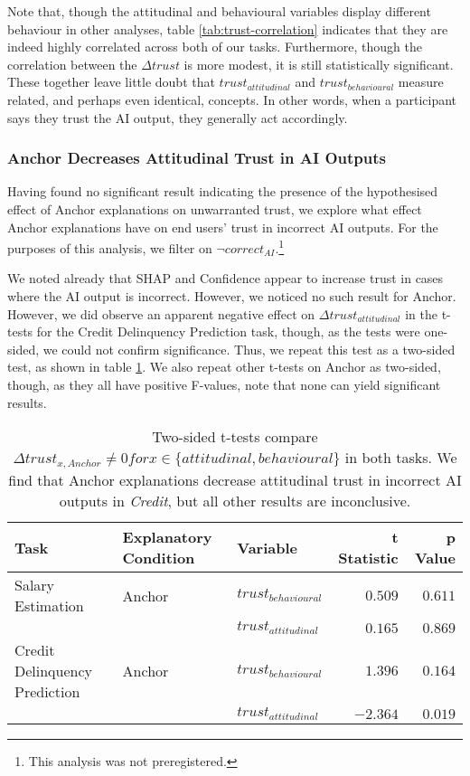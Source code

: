 Note that, though the attitudinal and behavioural variables display different behaviour in other analyses, table \ref{tab:trust-correlation} indicates that they are indeed highly correlated across both of our tasks. Furthermore, though the correlation between the $\Delta trust$ is more modest, it is still statistically significant. These together leave little doubt that $trust_{attitudinal}$ and $trust_{behavioural}$ measure related, and perhaps even identical, concepts. In other words, when a participant says they trust the AI output, they generally act accordingly.

\subsubsection{Anchor Decreases Attitudinal Trust in AI Outputs}\label{sec:anchor-attitudinal}
Having found no significant result indicating the presence of the hypothesised effect of Anchor explanations on unwarranted trust, we explore what effect Anchor explanations have on end users' trust in incorrect AI outputs. For the purposes of this analysis, we filter on $\neg correct_{AI}$.\footnote{This analysis was not preregistered.}

We noted already that SHAP and Confidence appear to increase trust in cases where the AI output is incorrect. However, we noticed no such result for Anchor. However, we did observe an apparent negative effect on $\Delta trust_{attitudinal}$ in the t-tests for the Credit Delinquency Prediction task, though, as the tests were one-sided, we could not confirm significance. Thus, we repeat this test as a two-sided test, as shown in table \ref{tab:delta-trust-t-2}. We also repeat other t-tests on Anchor as two-sided, though, as they all have positive F-values, note that none can yield significant results.

\begin{table}[htb]
    \caption{Two-sided t-tests compare $\Delta trust_{x,Anchor} \neq 0 for x \in \{attitudinal, behavioural\}$ in both tasks. We find that Anchor explanations decrease attitudinal trust in incorrect AI outputs in \emph{Credit}, but all other results are inconclusive.}
    \label{tab:delta-trust-t-2}
    \begin{tabular}{lllrr}
        \toprule
        Task & Explanatory Condition & Variable & t Statistic & p Value \\ 
        \midrule
        Salary Estimation & Anchor & $trust_{behavioural}$ & $0.509$ & $0.611$ \\
        & & $trust_{attitudinal}$ & $0.165$ & $0.869$ \\
        \midrule
        Credit Delinquency Prediction & Anchor & $trust_{behavioural}$ & $1.396$ & $0.164$ \\
        & & $trust_{attitudinal}$ & $\mathbf{-2.364}$ & $\mathbf{0.019}$ \\
        \bottomrule
    \end{tabular}
\end{table}

